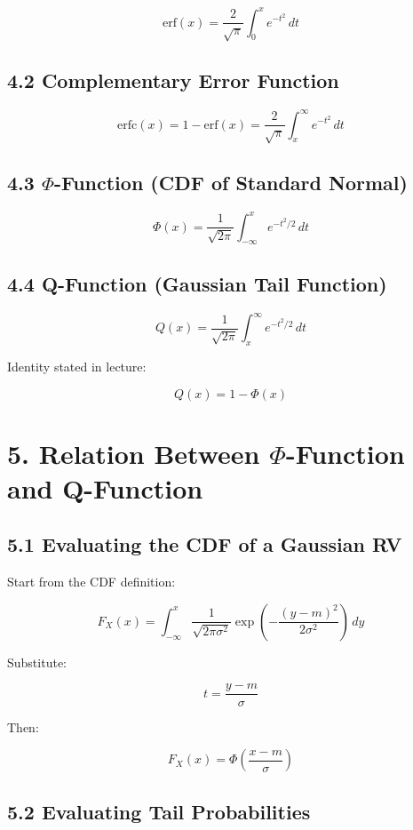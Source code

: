 \documentclass[12pt]{article}
\begin{document}
\[
\mathrm{erf}(x) = \frac{2}{\sqrt{\pi}} \int_{0}^{x} e^{-t^2}\, dt
\]

\subsection*{4.2 Complementary Error Function}

\[
\mathrm{erfc}(x) = 1 - \mathrm{erf}(x) = \frac{2}{\sqrt{\pi}} \int_{x}^{\infty} e^{-t^2}\, dt
\]

\subsection*{4.3 $\Phi$-Function (CDF of Standard Normal)}

\[
\Phi(x) = \frac{1}{\sqrt{2\pi}} \int_{-\infty}^{x} e^{-t^2/2}\, dt
\]

\subsection*{4.4 Q-Function (Gaussian Tail Function)}

\[
Q(x) = \frac{1}{\sqrt{2\pi}} \int_{x}^{\infty} e^{-t^2/2}\, dt
\]

Identity stated in lecture:

\[
Q(x) = 1 - \Phi(x)
\]

\section*{5. Relation Between $\Phi$-Function and Q-Function}

\subsection*{5.1 Evaluating the CDF of a Gaussian RV}

Start from the CDF definition:

\[
F_X(x) = \int_{-\infty}^{x} \frac{1}{\sqrt{2\pi\sigma^2}} \exp\left(-\frac{(y-m)^2}{2\sigma^2}\right)\, dy
\]

Substitute:

\[
t = \frac{y-m}{\sigma}
\]

Then:

\[
F_X(x) = \Phi\left(\frac{x-m}{\sigma}\right)
\]

\subsection*{5.2 Evaluating Tail Probabilities}
\end{document}
